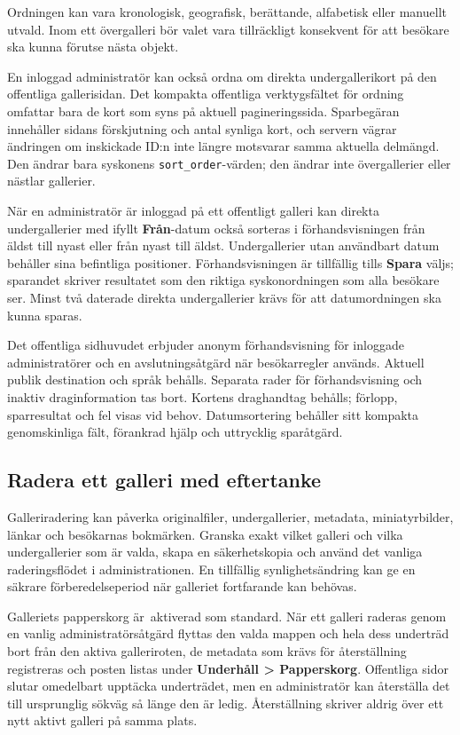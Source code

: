 \documentclass[11pt,a4paper]{article}
\newcommand{\ui}[1]{\textbf{#1}}
\newcommand{\codeword}[1]{\nolinkurl{#1}}
\begin{document}
Ordningen kan vara kronologisk, geografisk, berättande, alfabetisk eller
manuellt utvald. Inom ett övergalleri bör valet vara tillräckligt konsekvent för
att besökare ska kunna förutse nästa objekt.

En inloggad administratör kan också ordna om direkta undergallerikort på den
offentliga gallerisidan. Det kompakta offentliga verktygsfältet för ordning
omfattar bara de kort som syns på aktuell pagineringssida. Sparbegäran
innehåller sidans förskjutning och antal synliga kort, och servern vägrar
ändringen om inskickade ID:n inte längre motsvarar samma aktuella delmängd. Den
ändrar bara syskonens \codeword{sort_order}-värden; den ändrar inte
övergallerier eller nästlar gallerier.

När en administratör är inloggad på ett offentligt galleri kan direkta
undergallerier med ifyllt \ui{Från}-datum också sorteras i förhandsvisningen
från äldst till nyast eller från nyast till äldst. Undergallerier utan
användbart datum behåller sina befintliga positioner. Förhandsvisningen är
tillfällig tills \ui{Spara} väljs; sparandet skriver resultatet som den riktiga
syskonordningen som alla besökare ser. Minst två daterade direkta undergallerier
krävs för att datumordningen ska kunna sparas.

Det offentliga sidhuvudet erbjuder anonym förhandsvisning för inloggade
administratörer och en avslutningsåtgärd när besökarregler används. Aktuell
publik destination och språk behålls. Separata rader för förhandsvisning och
inaktiv draginformation tas bort. Kortens draghandtag behålls; förlopp,
sparresultat och fel visas vid behov. Datumsortering behåller sitt kompakta
genomskinliga fält, förankrad hjälp och uttrycklig sparåtgärd.

\subsection{Radera ett galleri med eftertanke}

Galleriradering kan påverka originalfiler, undergallerier, metadata,
miniatyrbilder, länkar och besökarnas bokmärken. Granska exakt vilket galleri
och vilka undergallerier som är valda, skapa en säkerhetskopia och använd det
vanliga raderingsflödet i administrationen. En tillfällig synlighetsändring kan
ge en säkrare förberedelseperiod när galleriet fortfarande kan behövas.

Galleriets papperskorg är~aktiverad som standard. När ett galleri raderas genom
en vanlig administratörsåtgärd flyttas den valda mappen och hela dess underträd
bort från den aktiva galleriroten, de metadata som krävs för återställning
registreras och posten listas under \ui{Underhåll > Papperskorg}. Offentliga
sidor slutar omedelbart upptäcka underträdet, men en administratör kan
återställa det till ursprunglig sökväg så länge den är ledig. Återställning
skriver aldrig över ett nytt aktivt galleri på samma plats.
\end{document}
